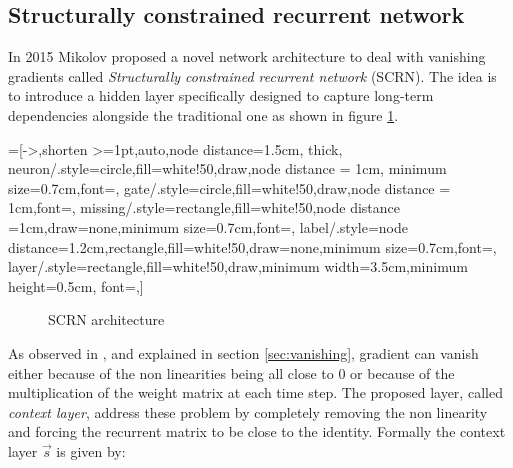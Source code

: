 \subsection{Structurally constrained recurrent network}

In 2015 Mikolov proposed a novel network architecture to deal with vanishing gradients \cite{scrn} called 
\textit{Structurally constrained recurrent network} (SCRN). The idea is to introduce a hidden layer specifically 
designed to capture long-term dependencies alongside the traditional one as shown in figure \ref{fig:scrn}.


=[->,shorten >=1pt,auto,node distance=1.5cm,
  thick,
  neuron/.style={circle,fill=white!50,draw,node distance = 1cm, minimum size=0.7cm,font=\sffamily\Large\bfseries},
  gate/.style={circle,fill=white!50,draw,node distance = 1cm,font=\sffamily\small\bfseries},
  missing/.style={rectangle,fill=white!50,node distance =1cm,draw=none,minimum size=0.7cm,font=\sffamily\Huge\bfseries},
  label/.style={node distance=1.2cm,rectangle,fill=white!50,draw=none,minimum size=0.7cm,font=\sffamily\normalsize},
  layer/.style={rectangle,fill=white!50,draw,minimum width=3.5cm,minimum height=0.5cm, font=\sffamily\normalsize},]
\begin{figure}[!ht]
 \centering
{}
\caption{SCRN architecture}
\label{fig:scrn}
\end{figure}


As observed in \cite{scrn}, and explained in section \ref{sec:vanishing}, gradient can vanish either because of the 
non linearities being all close to 0 or because of the multiplication of the weight matrix at each time step. The proposed 
layer, called \textit{context layer}, address these problem by completely removing the non linearity and forcing the 
recurrent matrix to be close to the identity. Formally the context layer  $\vec{s}$ is given by:

